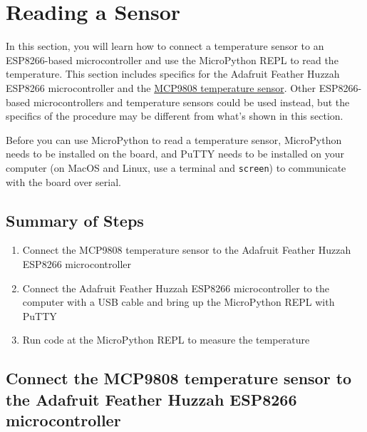 \documentclass{book}
\providecommand{\tightlist}{%
      \setlength{\itemsep}{0pt}\setlength{\parskip}{0pt}}
\newcommand{\passthrough}[1]{#1}
\begin{document}
    
        \hypertarget{reading-a-sensor}{%
\section{Reading a Sensor}\label{reading-a-sensor}}
    




    
        In this section, you will learn how to connect a temperature sensor to
an ESP8266-based microcontroller and use the MicroPython REPL to read
the temperature. This section includes specifics for the Adafruit
Feather Huzzah ESP8266 microcontroller and the
\href{https://www.adafruit.com/product/1782}{MCP9808 temperature
sensor}. Other ESP8266-based microcontrollers and temperature sensors
could be used instead, but the specifics of the procedure may be
different from what's shown in this section.

Before you can use MicroPython to read a temperature sensor, MicroPython
needs to be installed on the board, and PuTTY needs to be installed on
your computer (on MacOS and Linux, use a terminal and
\passthrough{\lstinline!screen!}) to communicate with the board over
serial.
    




    
        \hypertarget{summary-of-steps}{%
\subsection{Summary of Steps}\label{summary-of-steps}}
    




    
        \begin{enumerate}
\def\labelenumi{\arabic{enumi}.}
\tightlist
\item
  Connect the MCP9808 temperature sensor to the Adafruit Feather Huzzah
  ESP8266 microcontroller
\item
  Connect the Adafruit Feather Huzzah ESP8266 microcontroller to the
  computer with a USB cable and bring up the MicroPython REPL with PuTTY
\item
  Run code at the MicroPython REPL to measure the temperature
\end{enumerate}
    




    
        \hypertarget{connect-the-mcp9808-temperature-sensor-to-the-adafruit-feather-huzzah-esp8266-microcontroller}{%
\subsection{Connect the MCP9808 temperature sensor to the Adafruit
Feather Huzzah ESP8266
microcontroller}\label{connect-the-mcp9808-temperature-sensor-to-the-adafruit-feather-huzzah-esp8266-microcontroller}}
    
\end{document}
